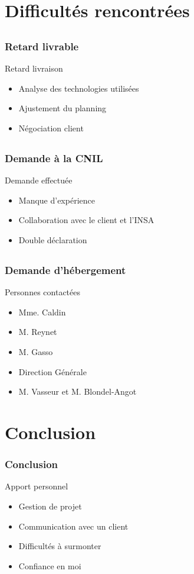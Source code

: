 \documentclass[compress,xcolor=dvipsnames]{beamer}
\begin{document}
\section{Difficultés rencontrées}
\subsection{}
\begin{frame}
\frametitle{Retard livrable}
\begin{block}{Retard livraison}
\begin{itemize}
	\item Analyse des technologies utilisées
	\item Ajustement du planning
	\item Négociation client
\end{itemize}
\end{block}
\end{frame}


\subsection{}
\begin{frame}
\frametitle{Demande à la CNIL}
\begin{block}{Demande effectuée}
\begin{itemize}
	\item Manque d’expérience
	\item Collaboration avec le client et l'INSA
	\item Double déclaration
\end{itemize}
\end{block}
\end{frame}


\subsection{}
\begin{frame}
\frametitle{Demande d'hébergement}
\begin{block}{Personnes contactées}
\begin{itemize}
	\item Mme. Caldin
	\item M. Reynet
	\item M. Gasso
	\item Direction Générale
	\item M. Vasseur et M. Blondel-Angot
\end{itemize}
\end{block}
\end{frame}



\section{Conclusion}
\begin{frame}
\frametitle{Conclusion}
\begin{block}{Apport personnel}
\begin{itemize}
	\item Gestion de projet
	\item Communication avec un client
	\item Difficultés à surmonter
	\item Confiance en moi
\end{itemize}
\end{block}
\end{frame}
\end{document}
